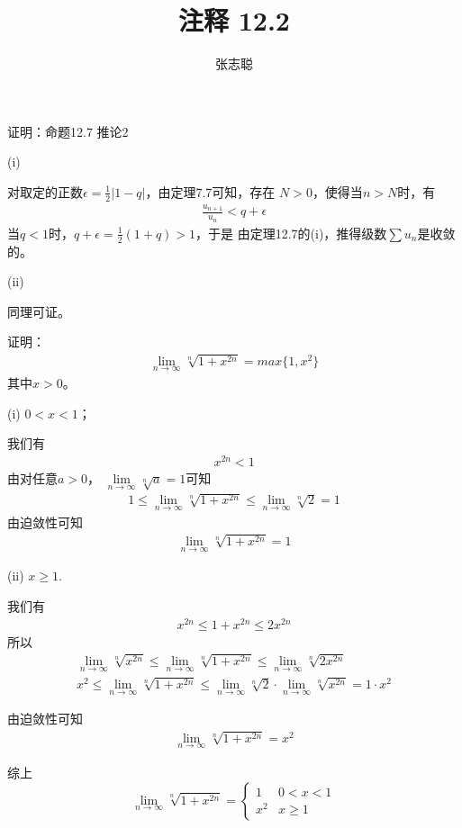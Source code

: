 \documentclass{article}
\begin{document}
\title{注释 12.2}
\author{张志聪}
\maketitle

\begin{zremark}
  证明：命题12.7 推论2
\end{zremark}

(i)

对取定的正数$\epsilon = \frac{1}{2}|1 - q|$，由定理7.7可知，存在
$N > 0$，使得当$n > N$时，有
\begin{align*}
  \frac{u_{n + 1}}{u_n} < q + \epsilon
\end{align*}
当$q < 1$时，$q + \epsilon = \frac{1}{2} (1 + q) > 1$，于是
由定理12.7的(i)，推得级数$\sum u_n$是收敛的。

(ii)

同理可证。

\begin{zremark}
  证明：
  \begin{align*}
    \lim\limits_{n \to \infty} \sqrt[n]{1 + x^{2n}} = max\{1, x^2\}
  \end{align*}
  其中$x > 0$。
\end{zremark}

(i) $0 < x < 1$；

我们有
\begin{align*}
  x^{2n} < 1
\end{align*}
由对任意$a > 0$， $\lim\limits_{n \to \infty} \sqrt[n]{a} = 1$可知
\begin{align*}
  1 \leq \lim\limits_{n \to \infty} \sqrt[n]{1 + x^{2n}} \leq \lim\limits_{n \to \infty} \sqrt[n]{2} = 1
\end{align*}
由迫敛性可知
\begin{align*}
  \lim\limits_{n \to \infty} \sqrt[n]{1 + x^{2n}} = 1
\end{align*}

(ii) $x \geq 1$.

我们有
\begin{align*}
  x^{2n} \leq 1 + x^{2n} \leq 2x^{2n}
\end{align*}
所以
\begin{align*}
  \lim\limits_{n \to \infty} \sqrt[n]{x^{2n}} \leq \lim\limits_{n \to \infty} \sqrt[n]{1 + x^{2n}} \leq \lim\limits_{n \to \infty} \sqrt[n]{2x^{2n}} \\
  x^2 \leq \lim\limits_{n \to \infty} \sqrt[n]{1 + x^{2n}} \leq \lim\limits_{n \to \infty} \sqrt[n]{2} \cdot \lim\limits_{n \to \infty} \sqrt[n]{x^{2n}} = 1 \cdot x^2
\end{align*}

由迫敛性可知
\begin{align*}
  \lim\limits_{n \to \infty} \sqrt[n]{1 + x^{2n}} = x^2
\end{align*}

综上
\begin{equation*}
  \lim\limits_{n \to \infty} \sqrt[n]{1 + x^{2n}} =
  \begin{cases}
    1   & 0 < x < 1 \\
    x^2 & x \geq 1
  \end{cases}
\end{equation*}
\end{document}
